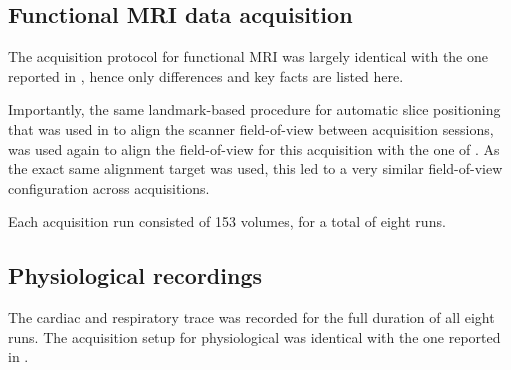 \subsection*{Functional MRI data acquisition}

The acquisition protocol for functional MRI was largely identical with the one
reported in \citet{Hanke_2014}, hence only differences and key facts are listed
here.

Importantly, the same landmark-based procedure for automatic slice positioning
that was used in \citet{Hanke_2014} to align the scanner field-of-view between
acquisition sessions, was used again to align the field-of-view for this
acquisition with the one of \citet{Hanke_2014}. As the exact same alignment
target was used, this led to a very similar field-of-view configuration across
acquisitions.

Each acquisition run consisted of 153 volumes, for a total of eight runs.

\subsection*{Physiological recordings}

The cardiac and respiratory trace was recorded for the full duration of all
eight runs. The acquisition setup for physiological was identical with the one
reported in \citet{Hanke_2014}.
